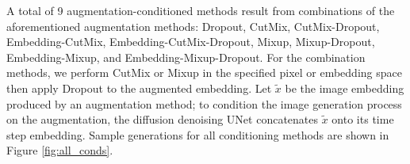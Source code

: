 A total of 9 augmentation-conditioned methods result from combinations of the aforementioned augmentation methods: Dropout, CutMix, CutMix-Dropout, Embedding-CutMix, Embedding-CutMix-Dropout, Mixup, Mixup-Dropout, Embedding-Mixup, and Embedding-Mixup-Dropout. 
For the combination methods, we perform CutMix or Mixup in the specified pixel or embedding space then apply Dropout to the augmented embedding.
Let $\tilde{x}$ be the image embedding produced by an augmentation method; to condition the image generation process on the augmentation, the diffusion denoising UNet \citep{unet} concatenates $\tilde{x}$ onto its time step embedding. 
Sample generations for all conditioning methods are shown in Figure \ref{fig:all_conds}. 